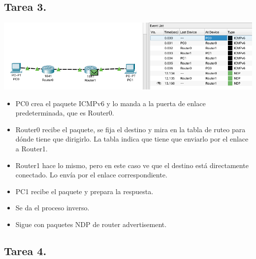 \documentclass[11pt]{article}
\begin{document}
\subsection*{Tarea 3.}
\label{sec:orgea86017}
\begin{center}
\includegraphics[width=.9\linewidth]{./icmp.png}
\end{center}
\begin{itemize}
\item PC0 crea el paquete ICMPv6 y lo manda a la puerta de enlace predeterminada, que es Router0.
\item Router0 recibe el paquete, se fija el destino y mira en la tabla de ruteo para dónde tiene que dirigirlo. La tabla indica que tiene que enviarlo por el enlace a Router1.
\item Router1 hace lo mismo, pero en este caso ve que el destino está directamente conectado. Lo envía por el enlace correspondiente.
\item PC1 recibe el paquete y prepara la respuesta.
\item Se da el proceso inverso.
\item Sigue con paquetes NDP de router advertisement.
\end{itemize}
\newpage
\subsection*{Tarea 4.}
\label{sec:org0bacb53}
\end{document}
